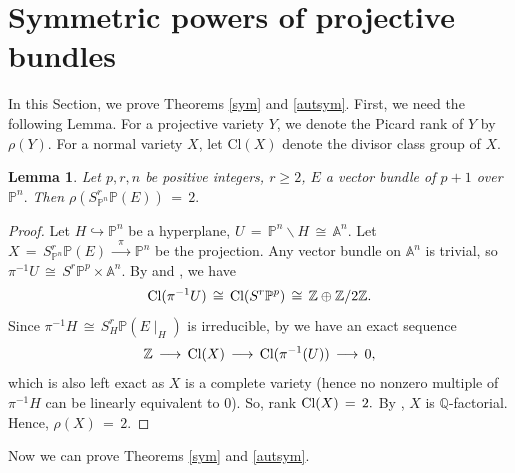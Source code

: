 \documentclass[12pt,reqno]{amsart}
\newtheorem{lemma}{Lemma}[section]
\theoremstyle{definition}
\numberwithin{equation}{section}
\begin{document}
\section{Symmetric powers of projective bundles}
In this Section, we prove Theorems \ref{sym} and \ref{autsym}.
First, we need the following Lemma. For a projective variety $Y$, we denote the Picard rank of $Y$ by $\rho(Y).$ For a normal variety $X$, let Cl$(X)$ denote the divisor class group of $X.$
 \begin{lemma}\label{picard}
Let $ p,r,n$ be positive integers, $r\geq 2$, $E$ a vector bundle of $ p+1$ over $\mathbb{P}^n.$ Then $ \rho(S_{\mathbb{P}^n}^{r}\mathbb{P}(E))\,=\,2.$ 
\end{lemma}
      
\begin{proof}
Let $H \hookrightarrow \mathbb{P}^n$ be a hyperplane, $U\,=\, \mathbb{P}^n \backslash  H \,\cong\, \mathbb{A}^n.$ Let $ X\,=\, S_{\mathbb{P}^n}^{r} \mathbb{P}(E) \,\xrightarrow{\,\,\,\pi\,\,\,}\, \mathbb{P}^n$ be the projection. Any vector bundle on $\mathbb{A}^n$ is trivial, so $ \pi^{-1} U \,\cong\, S^{r} \mathbb{P}^p \times \mathbb{A}^n$. By {\cite[Proposition 6.6, Chapter 2]{Hart}} and {\cite[Theorem 1(ii)]{BansalSarkarVats2025_SymmetricPower}}, we have $$ \textnormal{Cl}(\pi^{-1}{U}) \,\cong\, \textnormal{Cl} (S^{r} \mathbb{P}^{p}) \,\cong\, \mathbb{Z} \oplus \mathbb{Z}/2 \mathbb{Z}.$$ Since $ \pi^{-1} H\,\cong\, S_{H}^{r} \mathbb{P}(E\mid_{H})$ is irreducible, by {\cite[Proposition 6.5, Chapter 2]{Hart}} we have an exact sequence 
$$ \mathbb{Z} \,\longrightarrow\, \textnormal{Cl}( X) \,\longrightarrow\, \textnormal{Cl}(\pi^{-1}(U)) \,\longrightarrow\, 0, $$ 
which is also left exact as $X$ is a complete variety (hence no nonzero multiple of $\pi^{-1}H$ can be linearly equivalent to 0).  
 So, rank $ \textnormal{Cl}(X) \,=\,2.$ By  {\cite[Lemma 5.16]{Wil}}, $ X$ is $ \mathbb{Q}$-factorial. Hence, $ \rho(X)\,=\,2.$
\end{proof}
Now we can prove Theorems \ref{sym} and \ref{autsym}.
\end{document}
